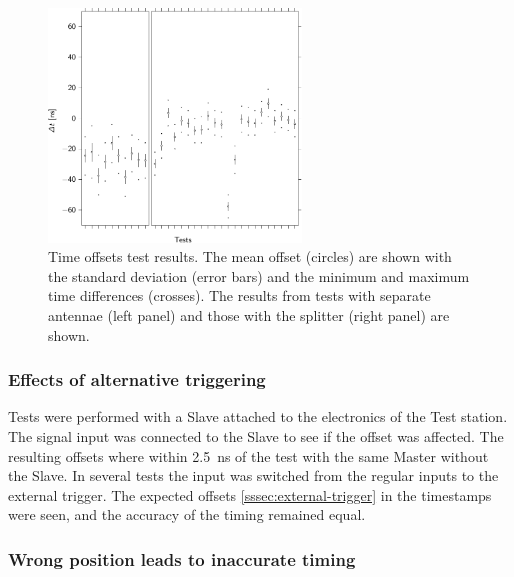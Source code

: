 \begin{figure}
    \centering
    \includegraphics[width=0.6\textwidth]
                    {plots/cluster/tt_offset_Good}
    \caption{Time offsets test results. The mean offset (circles) are shown with the standard deviation (error bars) and the minimum and maximum time differences (crosses). The results from tests with separate \gps antennae (left panel) and those with the splitter (right panel) are shown.}
    \label{fig:tt_offset_Good}
\end{figure}


\subsubsection{Effects of alternative triggering}

Tests were performed with a Slave attached to the electronics of the Test station. The signal input was connected to the Slave to see if the offset was affected. The resulting offsets where within \SI{2.5}{\ns} of the test with the same Master without the Slave. In several tests the input was switched from the regular \pmt inputs to the external trigger. The expected offsets \cref{sssec:external-trigger} in the \gps timestamps were seen, and the accuracy of the timing remained equal.


\subsubsection{Wrong position leads to inaccurate timing}


